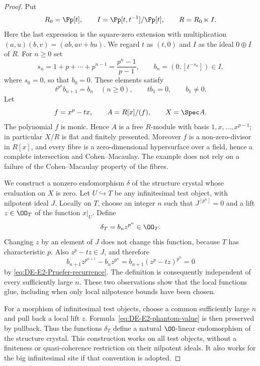 \begin{proof}
Put
\[
 R_0=\Fp[t],\qquad I=\Fp[t,t^{-1}]/\Fp[t],\qquad
 R=R_0\ltimes I.
\]
Here the last expression is the square-zero extension with multiplication
$(a,u)(b,v)=(ab,av+bu)$.  We regard $t$ as $(t,0)$ and $I$ as the ideal $0\oplus I$ of $R$.  For $n\geq0$ set
\[
 s_n=1+p+\cdots+p^{n-1}=\frac{p^n-1}{p-1},\qquad
 b_n=(0,[t^{-s_n}])\in I,
\]
where $s_0=0$, so that $b_0=0$.  These elements satisfy
\begin{equation}\label{eq:DE-E2-Pruefer-recurrence}
 t^{p^n}b_{n+1}=b_n\quad(n\geq0),\qquad
 tb_1=0,\qquad b_1\ne0.
\end{equation}
Let
\[
 f=x^p-tx,\qquad A=R[x]/(f),\qquad X=\Spec A.
\]
The polynomial $f$ is monic.  Hence $A$ is a free $R$-module with basis $1,x,\ldots,x^{p-1}$; in particular $X/R$ is flat and finitely presented.  Moreover $f$ is a non-zero-divisor in $R[x]$, and every fibre is a zero-dimensional hypersurface over a field, hence a complete intersection and Cohen--Macaulay.  The example does not rely on a failure of the Cohen--Macaulay property of the fibres.

We construct a nonzero endomorphism $\delta$ of the structure crystal whose evaluation on $X$ is zero.  Let $U\hookrightarrow T$ be any infinitesimal test object, with nilpotent ideal $J$.  Locally on $T$, choose an integer $n$ such that $J^{[p^n]}=0$ and a lift $z\in\OO_T$ of the function $x|_U$.  Define
\begin{equation}\label{eq:DE-E2-phantom-value}
                     \delta_T=b_nz^{p^n}\in\OO_T.
\end{equation}
Changing $z$ by an element of $J$ does not change this function, because $T$ has characteristic $p$.  Also $z^p-tz\in J$, and therefore
\[
 b_{n+1}z^{p^{n+1}}-b_nz^{p^n}
       =b_{n+1}(z^p-tz)^{p^n}=0
\]
by \eqref{eq:DE-E2-Pruefer-recurrence}.  The definition is consequently independent of every sufficiently large $n$.  These two observations show that the local functions glue, including when only local nilpotence bounds have been chosen.

For a morphism of infinitesimal test objects, choose a common sufficiently large $n$ and pull back a local lift $z$.  Formula~\eqref{eq:DE-E2-phantom-value} is then preserved by pullback.  Thus the functions $\delta_T$ define a natural $\OO$-linear endomorphism of the structure crystal.  This construction works on all test objects, without a finiteness or quasi-coherence restriction on their nilpotent ideals.  It also works for the big infinitesimal site if that convention is adopted.


\end{proof}
